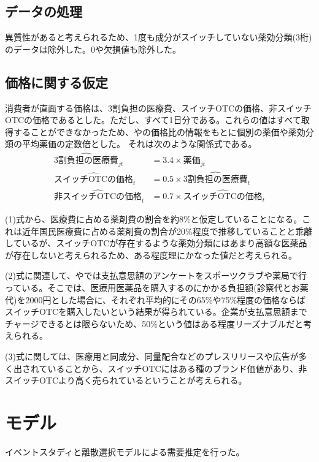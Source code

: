 \documentclass[a4paper,11pt,uplatex]{jsarticle}
\theoremstyle{definition}
\begin{document}
\subsection{データの処理}
異質性があると考えられるため、1度も成分がスイッチしていない薬効分類(3桁)のデータは除外した。0や欠損値も除外した。
\subsection{価格に関する仮定}
消費者が直面する価格は、3割負担の医療費、スイッチOTCの価格、非スイッチOTCの価格であるとした。ただし、すべて1日分である。これらの値はすべて取得することができなかったため、\cite{igarashi2021,igarashi2022}や\cite{iseikyoku2021}の価格比の情報をもとに個別の薬価や薬効分類の平均薬価の定数倍とした。 それは次のような関係式である。
\begin{align}
    \widehat {3割負担の医療費}_{jt}&=3.4\times 薬価_{jt}\\
    \widehat {\textrm{スイッチOTCの価格}}_t&=0.5 \times \widehat{\textrm{3割負担の医療費}}_t\\
    \widehat {\textrm{非スイッチOTCの価格}}_t&=0.7 \times \widehat {\textrm{スイッチOTCの価格}}_t
\end{align}

(1)式から、医療費に占める薬剤費の割合を約8\%と仮定していることになる。これは近年国民医療費に占める薬剤費の割合が20\%程度で推移していることと乖離しているが、スイッチOTCが存在するような薬効分類にはあまり高額な医薬品が存在しないと考えられるため、ある程度理にかなった値だと考えられる。

(2)式に関連して、\cite{narui2013}や\cite{narui2016}では支払意思額のアンケートをスポーツクラブや薬局で行っている。そこでは、医療用医薬品を購入するのにかかる負担額(診察代とお薬代)を2000円とした場合に、それぞれ平均的にその65\%や75\%程度の価格ならばスイッチOTCを購入したいという結果が得られている。企業が支払意思額までチャージできるとは限らないため、50\%という値はある程度リーズナブルだと考えられる。

(3)式に関しては、医療用と同成分、同量配合などのプレスリリースや広告が多く出されていることから、スイッチOTCにはある種のブランド価値があり、非スイッチOTCより高く売られているということが考えられる。
\section{モデル}
イベントスタディと離散選択モデルによる需要推定を行った。
\end{document}
